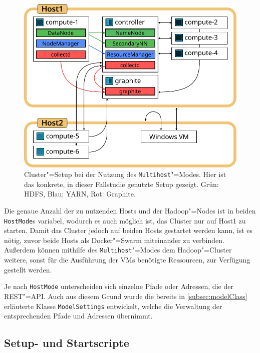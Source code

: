 \begin{figure}[h]
    \includegraphics{./resources/caseStudyHadoopSetup.pdf}
    \caption[Cluster"=Setup bei der Nutzung des Multihost"=Modes]
    {Cluster"=Setup bei der Nutzung des \texttt{Multihost}"=Modes.
    Hier ist das konkrete, in dieser Fallstudie genutzte Setup gezeigt.
    Grün: \ac{HDFS}, Blau: \ac{YARN}, Rot: Graphite.}
    \label{fig:caseStudyHadoopSetup}
\end{figure}

Die genaue Anzahl der zu nutzenden Hosts und der Hadoop"=Nodes ist in beiden \texttt{HostMode}s variabel, wodurch es auch möglich ist, das Cluster nur auf Host1 zu starten.
Damit das Cluster jedoch auf beiden Hosts gestartet werden kann, ist es nötig, zuvor beide Hosts als Docker"=Swarm miteinander zu verbinden.
Außerdem können mithilfe des \texttt{Multihost}"=Modes dem Hadoop"=Cluster weitere, sonst für die Ausführung der VMs benötigte Ressourcen, zur Verfügung gestellt werden.

Je nach \texttt{HostMode} unterscheiden sich einzelne Pfade oder Adressen, \zB die der REST"=API.
Auch aus diesem Grund wurde die bereits in \cref{subsec:modelClass} erläuterte Klasse \texttt{ModelSettings} entwickelt, welche die Verwaltung der entsprechenden Pfade und Adressen übernimmt.

\subsection{Setup- und Startscripte}
\label{subsec:scripts}

